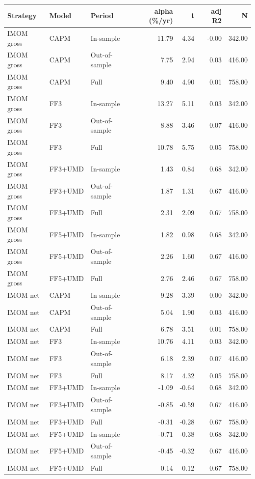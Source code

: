 \begin{tabular}{lllrrrr}
\toprule
Strategy & Model & Period & alpha (\%/yr) & t & adj R2 & N \\
\midrule
IMOM gross & CAPM & In-sample & 11.79 & 4.34 & -0.00 & 342.00 \\
IMOM gross & CAPM & Out-of-sample & 7.75 & 2.94 & 0.03 & 416.00 \\
IMOM gross & CAPM & Full & 9.40 & 4.90 & 0.01 & 758.00 \\
IMOM gross & FF3 & In-sample & 13.27 & 5.11 & 0.03 & 342.00 \\
IMOM gross & FF3 & Out-of-sample & 8.88 & 3.46 & 0.07 & 416.00 \\
IMOM gross & FF3 & Full & 10.78 & 5.75 & 0.05 & 758.00 \\
IMOM gross & FF3+UMD & In-sample & 1.43 & 0.84 & 0.68 & 342.00 \\
IMOM gross & FF3+UMD & Out-of-sample & 1.87 & 1.31 & 0.67 & 416.00 \\
IMOM gross & FF3+UMD & Full & 2.31 & 2.09 & 0.67 & 758.00 \\
IMOM gross & FF5+UMD & In-sample & 1.82 & 0.98 & 0.68 & 342.00 \\
IMOM gross & FF5+UMD & Out-of-sample & 2.26 & 1.60 & 0.67 & 416.00 \\
IMOM gross & FF5+UMD & Full & 2.76 & 2.46 & 0.67 & 758.00 \\
IMOM net & CAPM & In-sample & 9.28 & 3.39 & -0.00 & 342.00 \\
IMOM net & CAPM & Out-of-sample & 5.04 & 1.90 & 0.03 & 416.00 \\
IMOM net & CAPM & Full & 6.78 & 3.51 & 0.01 & 758.00 \\
IMOM net & FF3 & In-sample & 10.76 & 4.11 & 0.03 & 342.00 \\
IMOM net & FF3 & Out-of-sample & 6.18 & 2.39 & 0.07 & 416.00 \\
IMOM net & FF3 & Full & 8.17 & 4.32 & 0.05 & 758.00 \\
IMOM net & FF3+UMD & In-sample & -1.09 & -0.64 & 0.68 & 342.00 \\
IMOM net & FF3+UMD & Out-of-sample & -0.85 & -0.59 & 0.67 & 416.00 \\
IMOM net & FF3+UMD & Full & -0.31 & -0.28 & 0.67 & 758.00 \\
IMOM net & FF5+UMD & In-sample & -0.71 & -0.38 & 0.68 & 342.00 \\
IMOM net & FF5+UMD & Out-of-sample & -0.45 & -0.32 & 0.67 & 416.00 \\
IMOM net & FF5+UMD & Full & 0.14 & 0.12 & 0.67 & 758.00 \\

\end{tabular}
